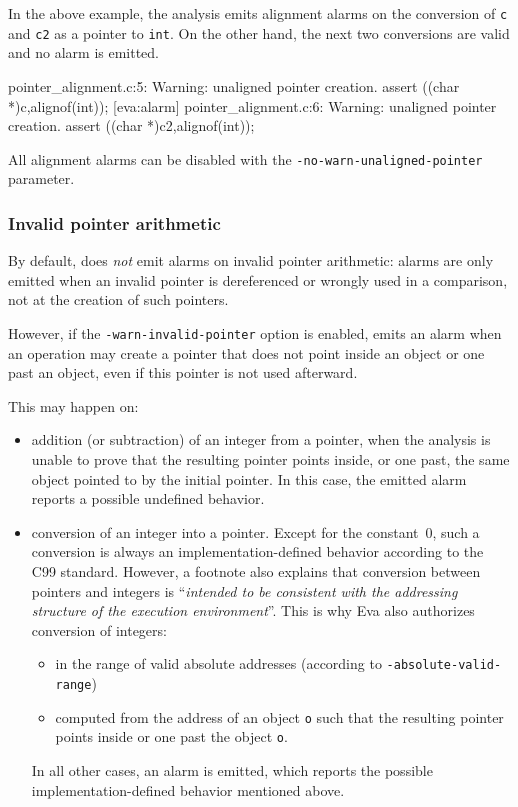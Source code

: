 \documentclass{frama-c-book}
\newcommand{\isoc}{\textsf{C99}}
\begin{document}

In the above example, the analysis emits alignment alarms on the conversion of
\lstinline|c| and \lstinline|c2| as a pointer to \lstinline|int|.
On the other hand, the next two conversions are valid and no alarm is emitted.

\begin{logsmath}
 pointer_alignment.c:5: Warning:
  unaligned pointer creation. assert \aligned((char *)c,alignof(int));
[eva:alarm] pointer_alignment.c:6: Warning:
  unaligned pointer creation. assert \aligned((char *)c2,alignof(int));
\end{logsmath}

All alignment alarms can be disabled with the
\lstinline|-no-warn-unaligned-pointer| parameter.


\subsubsection{Invalid pointer arithmetic}

By default, \Eva{} does \emph{not} emit alarms on invalid pointer arithmetic:
alarms are only emitted when an invalid pointer is dereferenced or wrongly used
in a comparison, not at the creation of such pointers.

However, if the \lstinline|-warn-invalid-pointer| option is enabled,
\Eva{} emits an alarm when an operation may create a pointer that does
not point inside an object or one past an object,
even if this pointer is not used afterward.

This may happen on:
\begin{itemize}
\item addition (or subtraction) of an integer from a pointer, when the analysis
  is unable to prove that the resulting pointer points inside, or one past,
  the same object pointed to by the initial pointer.
  In this case, the emitted alarm reports a possible undefined behavior.
\item conversion of an integer into a pointer. Except for the constant~0,
  such a conversion is always an implementation-defined behavior
  according to the \isoc{} standard. However, a footnote also explains that
  conversion between pointers and integers is ``\emph{intended to
  be consistent with the addressing structure of the execution environment}''.
  This is why Eva also authorizes conversion of integers:
  \begin{itemize}
  \item in the range of valid absolute addresses
    (according to \texttt{-absolute-valid-range})
  \item computed from the address of an object \lstinline|o| such that the
    resulting pointer points inside or one past the object \lstinline|o|.
  \end{itemize}
  In all other cases, an alarm is emitted, which reports the possible
  implementation-defined behavior mentioned above.
\end{itemize}
\end{document}
